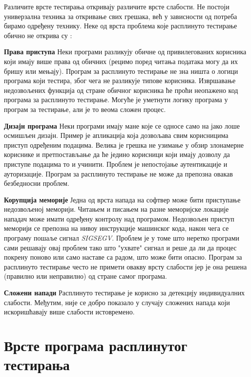 \documentclass[12pt,oneside]{memoir}
\begin{document}
Различите врсте тестирања откривају различите врсте слабости. Не постоји универзална техника за откривање свих грешака, већ у зависности од потреба бирамо одређену технику. Неке од врста проблема које расплинуто тестирање обично не открива су \cite{fuzzingBrute}:
\begin{description}
\item \textbf{Права приступа} Неки програми разликују обичне од привилегованих корисника који имају више права од обичних (рецимо поред читања података могу да их бришу или мењају). Програм за расплинуто тестирање не зна ништа о логици програма који тестира, због чега не разликује типове корисника. Извршавање недозвољених функција од стране обичног корисника ће проћи неопажено код програма за расплинуто тестирање. Могуће је уметнути логику програма у програм за тестирање, али је то веома сложен процес.  
\item \textbf{Дизајн програма} Неки програми имају мане које се односе само на јако лоше осмишљен дизајн. Пример је апликација која дозвољава свим корисницима приступ одређеним подацима. Велика је грешка не узимање у обзир злонамерне кориснике и претпостављање да ће једино корисници који имају дозволу да приступе подацима то и учинити. Проблем је непостојање аутентикације и ауторизације. Програм за расплинуто тестирање не може да препозна овакав безбедносни проблем.
\item \textbf{Корупција меморије} Једна од врста напада на софтвер може бити приступање недозвољеној меморији. Читањем и писањем на разне меморијске локације нападач може имати одређену контролу над програмом. Недозвољен приступ меморији се препозна на нивоу инструкције машинског кода, након чега се програму пошаље сигнал \textit{SIGSEGV}. Проблем је у томе што неретко програми сами решавају овај проблем тако што "ухвате" сигнал и реше да ли да процес покрену поново или само наставе са радом, што може бити опасно. Програм за расплинуто тестирање често не примети овакву врсту слабости јер је она решена (правилно или неправилно) од стране самог програма.
\item \textbf{Сложени напади} Расплинуто тестирање је корисно за детекцију индивидуалних слабости. Међутим, није се добро показало у случају сложених напада који искоришћавају више слабости истовремено.
\end{description}

\section{Врсте програма расплинутог тестирања}
\label{sec:vrsteProRaspTest}
\end{document}
